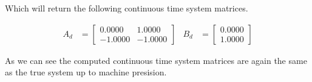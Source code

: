 Which will return the following continuous time system matrices.

\begin{align*}
A_d &= \begin{bmatrix} 0.0000 & 1.0000 \\ -1.0000 & -1.0000 \end{bmatrix} &
B_d &= \begin{bmatrix} 0.0000 \\ 1.0000 \end{bmatrix} 
\end{align*}

As we can see the computed continuous time system matrices are again the same as the true system up to machine presision.

